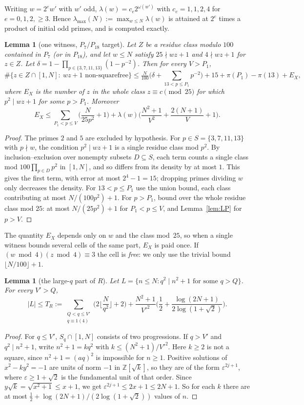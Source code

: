 \documentclass[11pt]{amsart}
\newtheorem{lemma}[theorem]{Lemma}
\theoremstyle{definition}
\theoremstyle{remark}
\begin{document}
Writing $w=2^e w'$ with $w'$ odd, $\lambda(w)=c_e2^{\omega(w')}$ with $c_e=1,1,2,4$ for $e=0,1,2,\ge3$. Hence
$\lambda_{\max}(N):=\max_{w\le N}\lambda(w)$ is attained at $2^e$ times a product of initial odd primes, and is
computed exactly.

\begin{lemma}[one witness, $P_7/P_{18}$ target]\label{lem:XY}
Let $Z$ be a residue class modulo $100$ contained in $P_7$ (or in $P_{18}$), and let $w\le N$ satisfy
$25\nmid wz+1$ and $4\nmid wz+1$ for $z\in Z$. Let $\delta=1-\prod_{p\in\{3,7,11,13\}}(1-p^{-2})$. Then for
every $V>P_1$,
\[
\#\{z\in Z\cap[1,N]:\ wz+1\text{ non-squarefree}\}\le \tfrac{N}{100}\Big(\delta+\!\!\sum_{13<p\le P_1}\!\!p^{-2}\Big)
+15+\pi(P_1)-\pi(13) + E_X,
\]
where $E_X$ is the number of $z$ in the whole class $z\equiv c\pmod{25}$ for which $p^2\mid wz+1$ for some
$p>P_1$. Moreover
\[
E_X\le \sum_{P_1<p\le V}\Big(\frac{N}{25p^2}+1\Big)+\lambda(w)\Big(\frac{N^2+1}{V^2}+\frac{2(N+1)}{V}+1\Big).
\]
\end{lemma}
\begin{proof}
The primes $2$ and $5$ are excluded by hypothesis. For $p\in S=\{3,7,11,13\}$ with $p\nmid w$, the condition
$p^2\mid wz+1$ is a single residue class mod $p^2$. By inclusion--exclusion over nonempty subsets $D\subseteq S$,
each term counts a single class mod $100\prod_{p\in D}p^2$ in $[1,N]$, and so differs from its density by at
most $1$. This gives the first term, with error at most $2^4-1=15$; dropping primes dividing $w$ only
decreases the density. For $13<p\le P_1$ use the union bound, each class contributing at most
$N/(100p^2)+1$. For $p>P_1$, bound over the whole residue class mod $25$: at most $N/(25p^2)+1$ for
$P_1<p\le V$, and Lemma~\ref{lem:LP} for $p>V$.
\end{proof}

The quantity $E_X$ depends only on $w$ and the class mod~$25$, so when a single witness bounds several cells
of the same part, $E_X$ is paid once. If $(w\bmod4)(z\bmod4)\equiv3$ the cell is \emph{free}: we only use the
trivial bound $\lfloor N/100\rfloor+1$.

\begin{lemma}[the large-$q$ part of $R$]\label{lem:TR}
Let $L=\{n\le N: q^2\mid n^2+1 \text{ for some } q>Q\}$. For every $V'>Q$,
\[
|L|\le T_R:=\sum_{\substack{Q<q\le V'\\ q\equiv1(4)}}\Big(2\Big\lfloor\frac{N}{q^2}\Big\rfloor+2\Big)
+\frac{N^2+1}{V'^2}\Big(\frac12+\frac{\log(2N+1)}{2\log(1+\sqrt2)}\Big).
\]
\end{lemma}
\begin{proof}
For $q\le V'$, $S_q\cap[1,N]$ consists of two progressions. If $q>V'$ and $q^2\mid n^2+1$, write
$n^2+1=kq^2$ with $k\le(N^2+1)/V'^2$. Here $k\ge2$ is not a square, since $n^2+1=(aq)^2$ is impossible for
$n\ge1$. Positive solutions of $x^2-ky^2=-1$ are units of norm $-1$ in $\mathbb Z[\sqrt k]$, so they are of the
form $\varepsilon^{2j+1}$, where $\varepsilon\ge1+\sqrt2$ is the fundamental unit of that order. Since
$y\sqrt k=\sqrt{x^2+1}\le x+1$, we get $\varepsilon^{2j+1}\le 2x+1\le2N+1$. So for each $k$ there are at most
$\frac12+\log(2N+1)/(2\log(1+\sqrt2))$ values of $n$.
\end{proof}
\end{document}
